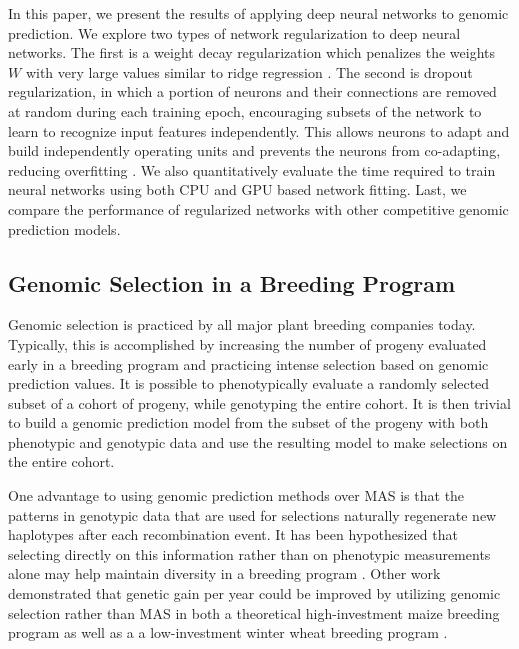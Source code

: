 In this paper, we present the results of applying deep neural networks
to genomic prediction. We explore two types of network regularization
to deep neural networks. The first is a weight decay regularization
which penalizes the weights $W$ with very large values 
similar to ridge regression \citep{krogh1992}. The second is dropout 
regularization, in which a portion of neurons and their connections are removed 
at random during each training epoch, encouraging subsets of the network to learn 
to recognize input features independently. This allows neurons to adapt 
and build independently operating units and prevents the 
neurons from co-adapting, reducing overfitting \citep{srivastava2014}.  
We also quantitatively evaluate the time required to train neural networks
using both CPU and GPU based network fitting. Last, we compare the 
performance of regularized networks with other competitive genomic prediction models.


\subsection{Genomic Selection in a Breeding Program}

Genomic selection is practiced by all major plant breeding companies today. 
Typically, this is accomplished by increasing the number of progeny evaluated
early in a breeding program and practicing intense selection based on genomic
prediction values. It is possible to phenotypically evaluate a randomly
selected subset of a cohort of progeny, while genotyping the entire cohort. It is
then trivial to build a genomic prediction model from the subset of the progeny
with both phenotypic and genotypic data and use the resulting model to make 
selections on the entire cohort. 

One advantage to using genomic prediction methods over MAS is that the 
patterns in genotypic data that are used for selections naturally regenerate
new haplotypes after each recombination event. It has been hypothesized that 
selecting directly on this information rather than on phenotypic measurements
alone may help maintain diversity in a breeding program \citep{daetwyler2007}.
Other work demonstrated that genetic gain per year could be improved
by utilizing genomic selection rather than MAS in both a theoretical high-investment
maize breeding program as well as a a low-investment winter wheat breeding program \citep{heffner2010}.

